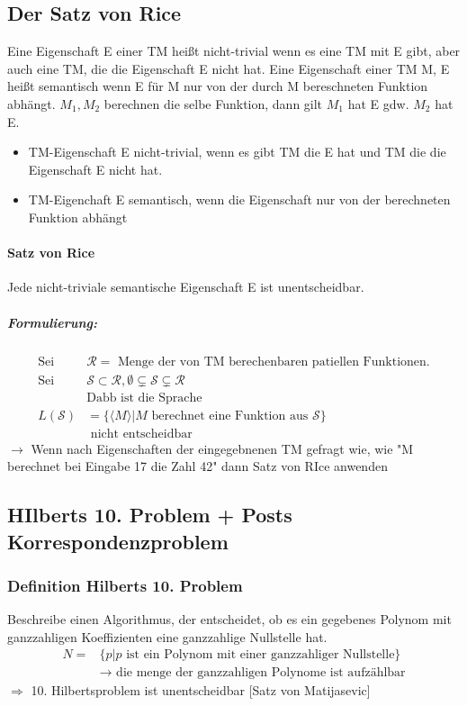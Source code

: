 \documentclass[a4paper, 10pt]{article}
\theoremstyle{definition}
\newcommand{\goedl}[1]{\langle {#1}\rangle}
\begin{document}
\subsection{Der Satz von Rice}
Eine Eigenschaft E einer TM heißt nicht-trivial wenn es eine TM mit E gibt, aber auch eine TM, die die Eigenschaft E nicht hat. Eine Eigenschaft einer TM M,  E heißt semantisch wenn E für M nur von der durch M bereschneten Funktion abhängt. $M_1,M_2$ berechnen die selbe Funktion, dann gilt $M_1$ hat E gdw. $M_2$ hat E.
\begin{itemize}
    \item TM-Eigenschaft E nicht-trivial, wenn es gibt TM die E hat und TM die die Eigenschaft E nicht hat.
    \item TM-Eigenchaft E semantisch, wenn die Eigenschaft nur von der berechneten Funktion abhängt\begin{itemize}
        \item $M_1\land M_2$ berechnen die selbe Funktion $\Longrightarrow M_1$ hat E gdw. $M_2}$ hat E
    \end{itemize}
\end{itemize}
\paragraph{Satz von Rice} Jede nicht-triviale semantische Eigenschaft E ist unentscheidbar. 
\subparagraph{Formulierung:}
\begin{align*}
    \text{Sei }&\mathcal{R}=\text{ Menge der von TM berechenbaren patiellen Funktionen.}\\
    \text{Sei }&\mathcal{S}\subset\mathcal{R},\emptyset\subsetneq\mathcal{S}\subsetneq\mathcal{R}\\
    &\text{Dabb ist die Sprache}\\
    L(\mathcal{S})&=\{\goedl{M}|M \text{ berechnet eine Funktion aus }\mathcal{S}\}\\
    &\text{ nicht entscheidbar}
\end{align*}
$\rightarrow$ Wenn nach Eigenschaften der eingegebnenen TM gefragt wie, wie "M berechnet bei Eingabe 17 die Zahl 42" dann Satz von RIce anwenden
\subsection{HIlberts 10. Problem + Posts Korrespondenzproblem}
\subsubsection{Definition Hilberts 10. Problem}
Beschreibe einen Algorithmus, der entscheidet, ob es ein gegebenes Polynom mit ganzzahligen Koeffizienten eine ganzzahlige Nullstelle hat.\begin{align*}
    N=&\{p|p\text{ ist ein Polynom mit einer ganzzahliger Nullstelle}\}\\
    &\to \text{ die menge der ganzzahligen Polynome ist aufzählbar}
\end{align*}
$\Longrightarrow$ 10. Hilbertsproblem ist unentscheidbar [Satz von Matijasevic]
\end{document}
